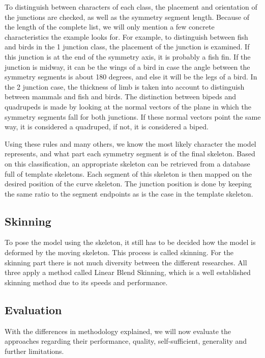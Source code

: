 \documentclass{article}
\begin{document}
To distinguish between characters of each class, the placement and orientation
of the junctions are checked, as well as the symmetry segment length. Because
of the length of the complete list, we will only mention a few concrete
characteristics the example looks for. For example, to distinguish between
fish and birds in the 1 junction class, the placement of the junction is
examined. If this junction is at the end of the symmetry axis, it is probably a
fish fin. If the junction is midway, it can be the wings of a bird in case the
angle between the symmetry segments is about 180 degrees, and else it will be the
legs of a bird. In the 2 junction case, the thickness of
limb is taken into account to distinguish between mammals and fish and birds.
The distinction between bipeds and quadrupeds is made by looking at the normal
vectors of the plane in which the symmetry segments fall for both junctions. If
these normal vectors point the same way, it is considered a quadruped, if not,
it is considered a biped. 

Using these rules and many others, we know the most likely character the model represents, and
what part each symmetry segment is of the final skeleton. Based on this
classification, an appropriate skeleton can be retrieved from a database full of
template skeletons. Each segment of this skeleton is then mapped on the desired
position of the curve skeleton. The junction position is done by keeping the
same ratio to the segment endpoints as is the case in the template skeleton.


\subsection{Skinning}
To pose the model using the skeleton, it still has to be decided how the model
is deformed by the moving skeleton. This process is called skinning. For the
skinning part there is not much diversity between the different researches. All
three apply a method called Linear Blend Skinning, which is a well established skinning method due
to its speeds and performance.




\subsection{Evaluation}
With the differences in methodology explained, we will now evaluate the
approaches regarding their performance, quality, self-sufficient, generality and
further limitations.
\end{document}
